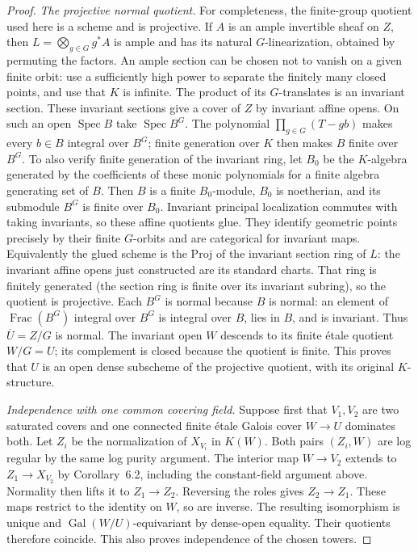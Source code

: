 \begin{proof}
\emph{The projective normal quotient.}
For completeness, the finite-group quotient used here is a
scheme and is projective. If $A$ is an ample invertible sheaf
on $Z$, then $L=\bigotimes_{g\in G}g^*A$ is ample and has its
natural $G$-linearization, obtained by permuting the factors.
An ample section can be chosen not to vanish on a given finite
orbit: use a sufficiently high power to separate the finitely
many closed points, and use that $K$ is infinite. The product
of its $G$-translates is an invariant section. These invariant
sections give a cover of $Z$ by invariant affine opens.
On such an open $\operatorname{Spec}B$ take
$\operatorname{Spec}B^G$. The polynomial
$\prod_{g\in G}(T-gb)$ makes every $b\in B$ integral over
$B^G$; finite generation over $K$ then makes $B$ finite over
$B^G$. To also verify finite generation of the invariant ring,
let $B_0$ be the $K$-algebra generated by the coefficients of
these monic polynomials for a finite algebra generating set of
$B$. Then $B$ is a finite $B_0$-module, $B_0$ is noetherian,
and its submodule $B^G$ is finite over $B_0$. Invariant
principal localization commutes with taking
invariants, so these affine quotients glue. They identify
geometric points precisely by their finite $G$-orbits and
are categorical for invariant maps. Equivalently the glued
scheme is the Proj of the invariant section ring of $L$:
the invariant affine opens just constructed are its standard
charts. That ring is finitely generated (the section ring is
finite over its invariant subring), so the quotient is projective.
Each $B^G$ is normal because $B$ is normal: an element of
$\operatorname{Frac}(B^G)$ integral over $B^G$ is integral over
$B$, lies in $B$, and is invariant. Thus $\overline U=Z/G$
is normal. The invariant open $W$ descends to its finite
\'etale quotient $W/G=U$; its complement is closed because
the quotient is finite. This proves that $U$ is an open dense
subscheme of the projective quotient, with its original
$K$-structure.

\emph{Independence with one common covering field.}
Suppose first that $V_1,V_2$ are two saturated covers and one
connected finite \'etale Galois cover $W\to U$ dominates both.
Let $Z_i$ be the normalization of $X_{V_i}$ in $K(W)$.
Both pairs $(Z_i,W)$ are log regular by the same log purity
argument. The interior map $W\to V_2$ extends to
$Z_1\to X_{V_2}$ by Corollary~6.2, including the constant-field
argument above. Normality then lifts it to $Z_1\to Z_2$.
Reversing the roles gives $Z_2\to Z_1$. These maps restrict
to the identity on $W$, so are inverse. The resulting
isomorphism is unique and $\operatorname{Gal}(W/U)$-equivariant
by dense-open equality. Their quotients therefore coincide.
This also proves independence of the chosen towers.


\end{proof}
